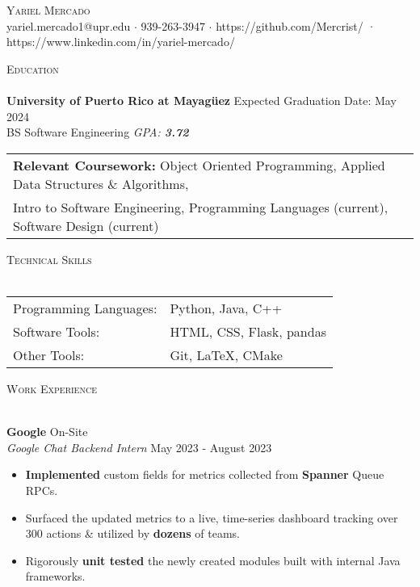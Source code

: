 \documentclass[a4paper]{article}
\newcommand{\lineunder} {
    \vspace*{-8pt} \\
    \hspace*{-18pt} \hrulefill \\
}
\newcommand{\header} [1] {
    {\hspace*{-18pt}\vspace*{6pt} \textsc{#1}}
    \vspace*{-6pt} \lineunder
}
\begin{document}
\vspace*{-40pt}

    

\vspace*{-10pt}
\begin{center}
	{\Huge \scshape {Yariel Mercado}}\\
	yariel.mercado1@upr.edu $\cdot$ 939-263-3947 $\cdot$ https://github.com/Mercrist/ · https://www.linkedin.com/in/yariel-mercado/\\
\end{center}

\header{Education}
\textbf{University of Puerto Rico at Mayagüez} \hfill Expected Graduation Date: May 2024\\	
BS Software Engineering \textit{GPA: \bf{3.72}} 

\vspace{2mm}
\begin{tabular}{ l l }
	\textbf{Relevant Coursework:} Object Oriented 	                    			Programming, Applied Data Structures \& Algorithms, \\ Intro to Software Engineering, Programming Languages (current), Software Design (current)
\vspace{2mm}
\end{tabular}

\header{Technical Skills}
\begin{tabular}{ l l }
	Programming Languages: & Python, Java, C++    \\
	Software Tools: & HTML, CSS, Flask, pandas \\
	Other Tools:   & Git, \LaTeX{}, CMake  \\
	
\end{tabular}
\vspace{2mm}

\header{Work Experience}
\vspace{-1mm}

\textbf{Google} \hfill On-Site\\
\textit{Google Chat Backend Intern} \hfill May 2023 - August 2023\\
\vspace{-2mm}
\begin{itemize} \itemsep -1pt
	\item \textbf{Implemented} custom fields for metrics collected from \textbf{Spanner} Queue RPCs.
	\item Surfaced the updated metrics to a live, time-series dashboard tracking over 300 actions \& utilized by \textbf{dozens} of teams.
	\item Rigorously \textbf{unit tested} the newly created modules built with internal Java frameworks.
\end{itemize}
\vspace{-2mm}
\end{document}
